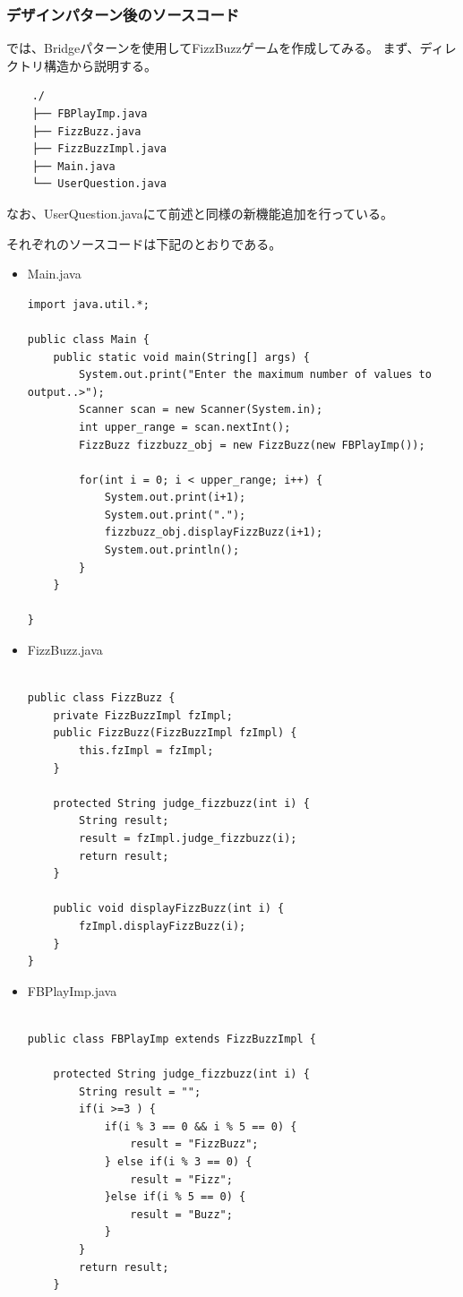 \documentclass[dvipdfmx]{jsarticle}
\begin{document}
\subsubsection{デザインパターン後のソースコード}
では、Bridgeパターンを使用してFizzBuzzゲームを作成してみる。
まず、ディレクトリ構造から説明する。
\begin{verbatim}
    ./
    ├── FBPlayImp.java
    ├── FizzBuzz.java
    ├── FizzBuzzImpl.java
    ├── Main.java
    └── UserQuestion.java
\end{verbatim}
なお、UserQuestion.javaにて前述と同様の新機能追加を行っている。\par
それぞれのソースコードは下記のとおりである。
\begin{itemize}
  \item Main.java
  \begin{verbatim}
import java.util.*;

public class Main {
    public static void main(String[] args) {
        System.out.print("Enter the maximum number of values to output..>");
        Scanner scan = new Scanner(System.in);
        int upper_range = scan.nextInt();
        FizzBuzz fizzbuzz_obj = new FizzBuzz(new FBPlayImp());

        for(int i = 0; i < upper_range; i++) {
            System.out.print(i+1);
            System.out.print(".");
            fizzbuzz_obj.displayFizzBuzz(i+1);
            System.out.println();
        }
    }

}
  \end{verbatim}
  \item FizzBuzz.java
\begin{verbatim}

public class FizzBuzz {
    private FizzBuzzImpl fzImpl;
    public FizzBuzz(FizzBuzzImpl fzImpl) {
        this.fzImpl = fzImpl;
    }

    protected String judge_fizzbuzz(int i) {
        String result;
        result = fzImpl.judge_fizzbuzz(i);
        return result;
    }

    public void displayFizzBuzz(int i) {
        fzImpl.displayFizzBuzz(i);
    }
}

  \end{verbatim}
  \item FBPlayImp.java
  \begin{verbatim}

public class FBPlayImp extends FizzBuzzImpl {

    protected String judge_fizzbuzz(int i) {
        String result = "";
        if(i >=3 ) {
            if(i % 3 == 0 && i % 5 == 0) {
                result = "FizzBuzz";
            } else if(i % 3 == 0) {
                result = "Fizz";
            }else if(i % 5 == 0) {
                result = "Buzz";
            }
        }
        return result;
    }


\end{verbatim}
\end{itemize}
\end{document}
